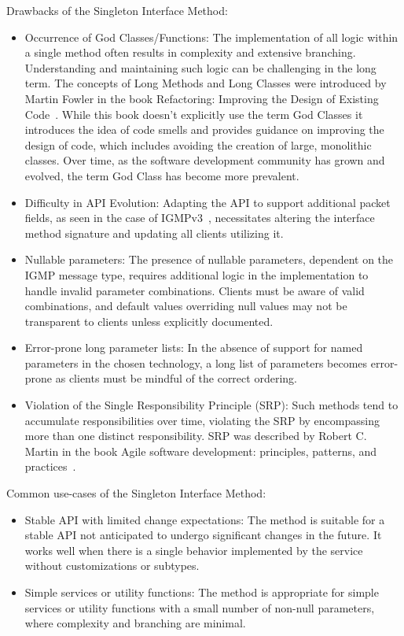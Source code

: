 Drawbacks of the Singleton Interface Method:

\begin{itemize}
    \item Occurrence of God Classes/Functions:
    The implementation of all logic within a single method often results in complexity and extensive branching.
    Understanding and maintaining such logic can be challenging in the long term.
    The concepts of Long Methods and Long Classes were introduced by Martin Fowler in the book Refactoring:
    Improving the Design of Existing Code~\cite[Chapter~3]{fowler1999refactoring}.
    While this book doesn't explicitly use the term God Classes it introduces the idea of code smells and provides
    guidance on improving the design of code, which includes avoiding the creation of large, monolithic classes.
    Over time, as the software development community has grown and evolved, the term God Class has become more
    prevalent.
    \item Difficulty in API Evolution:
    Adapting the API to support additional packet fields, as seen in the case of IGMPv3~\cite{rfc3376},
    necessitates altering the interface method signature and updating all clients utilizing it.
    \item Nullable parameters:
    The presence of nullable parameters, dependent on the IGMP message type, requires additional logic
    in the implementation to handle invalid parameter combinations.
    Clients must be aware of valid combinations, and default values overriding null values may not be transparent
    to clients unless explicitly documented.
    \item Error-prone long parameter lists:
    In the absence of support for named parameters in the chosen technology, a long list of parameters becomes
    error-prone as clients must be mindful of the correct ordering.
    \item Violation of the Single Responsibility Principle (SRP):
    Such methods tend to accumulate responsibilities over time, violating the SRP by encompassing more than one
    distinct responsibility.
    SRP was described by Robert C. Martin in the book Agile software development: principles, patterns,
    and practices~\cite[Chapter~8]{martin2003agile}.
\end{itemize}

Common use-cases of the Singleton Interface Method:

\begin{itemize}
    \item Stable API with limited change expectations:
    The method is suitable for a stable API not anticipated to undergo significant changes in the future.
    It works well when there is a single behavior implemented by the service without customizations or subtypes.
    \item Simple services or utility functions:
    The method is appropriate for simple services or utility functions with a small number of non-null parameters,
    where complexity and branching are minimal.
\end{itemize}
